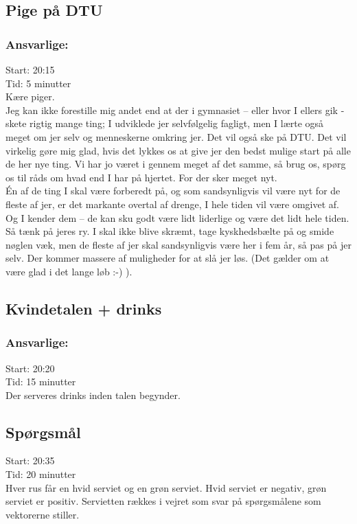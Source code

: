 \subsection*{Pige på DTU}
\subsubsection*{\textbf{Ansvarlige:} \Karla}
Start: 20:15 \\
Tid: 5 minutter \\
Kære piger. \\
Jeg kan ikke forestille mig andet end at der i gymnasiet – eller hvor I ellers gik - skete rigtig mange ting; I udviklede jer selvfølgelig fagligt, men I lærte også meget om jer selv og menneskerne omkring jer. Det vil også ske på DTU. Det vil virkelig gøre mig glad, hvis det lykkes os at give jer den bedst mulige start på alle de her nye ting. Vi har jo været i gennem meget af det samme, så brug os, spørg os til råds om hvad end I har på hjertet. For der sker meget nyt. \\
Én af de ting I skal være forberedt på, og som sandsynligvis vil være nyt for de fleste af jer, er det markante overtal af drenge, I hele tiden vil være omgivet af. Og I kender dem – de kan sku godt være lidt liderlige og være det lidt hele tiden. Så tænk på jeres ry. I skal ikke blive skræmt, tage kyskhedsbælte på og smide nøglen væk, men de fleste af jer skal sandsynligvis være her i fem år, så pas på jer selv. Der kommer massere af muligheder for at slå jer løs. (Det gælder om at være glad i det lange løb :-) ).

\subsection*{Kvindetalen + drinks}
\subsubsection*{\textbf{Ansvarlige:} \Randildo}
Start: 20:20 \\
Tid: 15 minutter \\
Der serveres drinks inden talen begynder. \\

\subsection*{Spørgsmål}
Start: 20:35 \\
Tid: 20 minutter \\
Hver rus får en hvid serviet og en grøn serviet. Hvid serviet er negativ, grøn serviet er positiv. Servietten rækkes i vejret som svar på spørgsmålene som vektorerne stiller.

